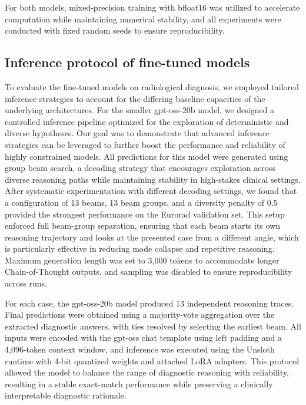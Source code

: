 \documentclass[10pt,journal,compsoc, onecolumn]{IEEEtran}
\begin{document}
For both models, mixed-precision training with bfloat16 was utilized to accelerate computation while maintaining numerical stability, and all experiments were conducted with fixed random seeds to ensure reproducibility.


\subsection*{Inference protocol of fine-tuned models}

To evaluate the fine-tuned models on radiological diagnosis, we employed tailored inference strategies to account for the differing baseline capacities of the underlying architectures. For the smaller gpt-oss-20b model, we designed a controlled inference pipeline optimized for the exploration of deterministic and diverse hypotheses. Our goal was to demonstrate that advanced inference strategies can be leveraged to further boost the performance and reliability of highly constrained models. All predictions for this model were generated using group beam search, a decoding strategy that encourages exploration across diverse reasoning paths while maintaining stability in high-stakes clinical settings. After systematic experimentation with different decoding settings, we found that a configuration of 13 beams, 13 beam groups, and a diversity penalty of 0.5 provided the strongest performance on the Eurorad validation set. This setup enforced full beam-group separation, ensuring that each beam starts its own reasoning trajectory and looks at the presented case from a different angle, which is particularly effective in reducing mode collapse and repetitive reasoning. Maximum generation length was set to 3,000 tokens to accommodate longer Chain-of-Thought outputs, and sampling was disabled to ensure reproducibility across runs.

For each case, the gpt-oss-20b model produced 13 independent reasoning traces. Final predictions were obtained using a majority-vote aggregation over the extracted diagnostic answers, with ties resolved by selecting the earliest beam. All inputs were encoded with the gpt-oss chat template using left padding and a 4,096-token context window, and inference was executed using the Unsloth runtime with 4-bit quantized weights and attached LoRA adapters. This protocol allowed the model to balance the range of diagnostic reasoning with reliability, resulting in a stable exact-match performance while preserving a clinically interpretable diagnostic rationale.
\end{document}
